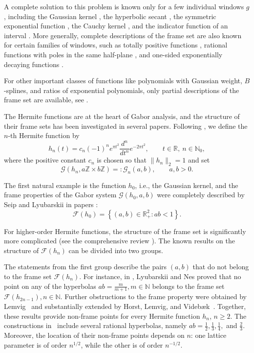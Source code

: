 \documentclass[11pt]{amsart}
\numberwithin{equation}{section}
\newcommand{\R}{{\mathbb R}}
\newcommand{\Z}{{\mathbb Z}}
\newcommand{\N}{{\mathbb N}}
\newcommand{\G}{\mathcal{G}}
\begin{document}
A complete solution to this problem is known only for a few individual windows
$g$, including the Gaussian kernel \cite{MR1188007, MR1173118}, the hyperbolic secant \cite{MR1884237}, the symmetric exponential function \cite{MR1964306}, the Cauchy kernel \cite{MR4345947}, and the indicator function of an interval \cite{MR3545108}. More generally, complete descriptions of the frame set are also known for certain families of windows,
such as totally positive functions \cite{totallypos_full2026, MR3763405, MR3053565}, rational functions with poles in
the same half-plane \cite{MR4542702}, and one-sided exponentially decaying functions \cite{MR5077907}.

For other important classes of functions like polynomials with Gaussian weight, $B$-splines, and ratios of exponential polynomials, only partial descriptions
of the frame set are available, see \cite{MR4484792, MR3398948, MR2529475, MR4832036, MR4865221}. 

The Hermite functions are at the heart of Gabor analysis, and the structure of their frame sets has been investigated in several papers. Following \cite{MR2529475}, we define the $n$-th Hermite function by
\begin{equation}\label{eq:hn}
    h_n(t)
    =
    c_n(-1)^n e^{\pi t^2}
    \frac{d^n}{dt^n}e^{-2\pi t^2},    
    \qquad t\in\R, \ n \in \N_0,
\end{equation}
where the positive constant $c_n$ is chosen so that $\|h_n\|_2=1$ and set
\begin{equation}
    \G(h_n,a\Z\times b\Z)=:\G_n(a,b),
    \qquad a,b>0.
\end{equation}


The first natural example is the function $h_0$, i.e., the Gaussian kernel,
and the frame properties of the Gabor system $\mathcal{G}(h_0,a,b)$ were completely described by Seip and Lyubarskii in papers \cite{MR1188007, MR1173118}:
\begin{equation}
    \mathcal{F}(h_0) = \left\{(a,b) \in \R^2_+ : ab < 1 \right\}.
\end{equation}

For higher-order Hermite functions, the structure of the frame set is significantly more complicated (see the comprehensive review \cite{MR3232589}).
The known results on the structure of $\mathcal{F}(h_n)$ can be divided into two groups. 

The statements from the first group describe the pairs $(a,b)$ that do not belong to the frame set $\mathcal{F}(h_n)$.
For instance, in \cite{MR3027914}, Lyubarskii and Nes proved that no point on any of the hyperbolas $ab=\frac{m}{m+1}, m \in \N$ belongs to the frame set $\mathcal{F}(h_{2n-1}), n \in \N.$ 
Further obstructions to the frame property were obtained by
Lemvig~\cite{MR3624951} and substantially extended by Horst, Lemvig, and
Videb{\ae}k~\cite{MR4849800}. Together, these results provide non-frame
points for every Hermite function $h_n$, $n\geq2$. The constructions
in~\cite{MR4849800} include several rational hyperbolas, namely
$ab=\frac12,\frac13,\frac14,$ and $\frac23$. Moreover, the location of
their non-frame points depends on $n$: one lattice parameter is of order
$n^{1/2}$, while the other is of order $n^{-1/2}$.
\end{document}
